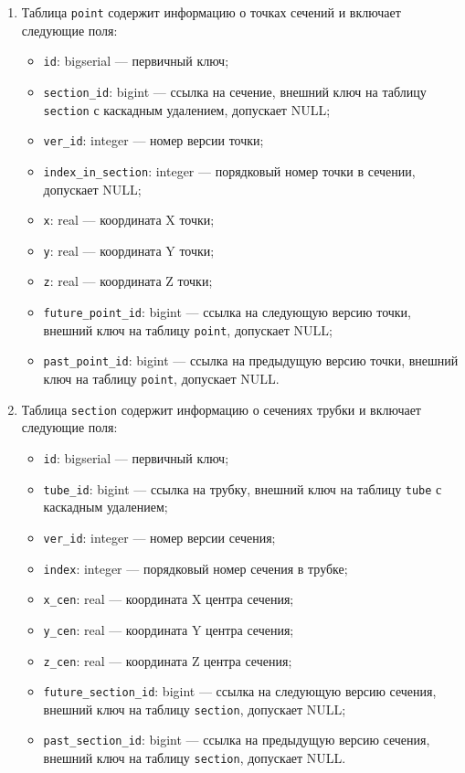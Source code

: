 \begin{enumerate}
    \item Таблица \texttt{point} содержит информацию о точках сечений и включает следующие поля:
        \begin{itemize}[leftmargin=\parindent]
            \item \texttt{id}: bigserial --- первичный ключ;
            \item \texttt{section\_id}: bigint --- ссылка на сечение, внешний ключ на таблицу \texttt{section} с каскадным удалением, допускает NULL;
            \item \texttt{ver\_id}: integer --- номер версии точки;
            \item \texttt{index\_in\_section}: integer --- порядковый номер точки в сечении, допускает NULL;
            \item \texttt{x}: real --- координата X точки;
            \item \texttt{y}: real --- координата Y точки;
            \item \texttt{z}: real --- координата Z точки;
            \item \texttt{future\_point\_id}: bigint --- ссылка на следующую версию точки, внешний ключ на таблицу \texttt{point}, допускает NULL;
            \item \texttt{past\_point\_id}: bigint --- ссылка на предыдущую версию точки, внешний ключ на таблицу \texttt{point}, допускает NULL.
        \end{itemize}

    \item Таблица \texttt{section} содержит информацию о сечениях трубки и включает следующие поля:
        \begin{itemize}[leftmargin=\parindent]
            \item \texttt{id}: bigserial --- первичный ключ;
            \item \texttt{tube\_id}: bigint --- ссылка на трубку, внешний ключ на таблицу \texttt{tube} с каскадным удалением;
            \item \texttt{ver\_id}: integer --- номер версии сечения;
            \item \texttt{index}: integer --- порядковый номер сечения в трубке;
            \item \texttt{x\_cen}: real --- координата X центра сечения;
            \item \texttt{y\_cen}: real --- координата Y центра сечения;
            \item \texttt{z\_cen}: real --- координата Z центра сечения;
            \item \texttt{future\_section\_id}: bigint --- ссылка на следующую версию сечения, внешний ключ на таблицу \texttt{section}, допускает NULL;
            \item \texttt{past\_section\_id}: bigint --- ссылка на предыдущую версию сечения, внешний ключ на таблицу \texttt{section}, допускает NULL.
        \end{itemize}


\end{enumerate}
